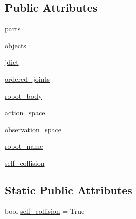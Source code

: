 \subsection*{Public Attributes}
\begin{DoxyCompactItemize}
\item 
\hyperlink{classpybullet-gym_1_1pybulletgym_1_1envs_1_1roboschool_1_1robots_1_1robot__bases_1_1_xml_based_robot_a2491b7eec86e9cd426047c4077561c48}{parts}
\item 
\hyperlink{classpybullet-gym_1_1pybulletgym_1_1envs_1_1roboschool_1_1robots_1_1robot__bases_1_1_xml_based_robot_a428a2aea133de4c5a2a55b2a2444ca21}{objects}
\item 
\hyperlink{classpybullet-gym_1_1pybulletgym_1_1envs_1_1roboschool_1_1robots_1_1robot__bases_1_1_xml_based_robot_a1f70bcc9f587d513c939a408a29d9f0e}{jdict}
\item 
\hyperlink{classpybullet-gym_1_1pybulletgym_1_1envs_1_1roboschool_1_1robots_1_1robot__bases_1_1_xml_based_robot_a1d3338143057849f1f760ce94a5976c0}{ordered\+\_\+joints}
\item 
\hyperlink{classpybullet-gym_1_1pybulletgym_1_1envs_1_1roboschool_1_1robots_1_1robot__bases_1_1_xml_based_robot_a99b7a7b654950adffa9dc38daa523b58}{robot\+\_\+body}
\item 
\hyperlink{classpybullet-gym_1_1pybulletgym_1_1envs_1_1roboschool_1_1robots_1_1robot__bases_1_1_xml_based_robot_a750c9a8aec0030cc9ed278fbcea18d37}{action\+\_\+space}
\item 
\hyperlink{classpybullet-gym_1_1pybulletgym_1_1envs_1_1roboschool_1_1robots_1_1robot__bases_1_1_xml_based_robot_a3179d41c6af31fdc7bedb3a4a1081a2a}{observation\+\_\+space}
\item 
\hyperlink{classpybullet-gym_1_1pybulletgym_1_1envs_1_1roboschool_1_1robots_1_1robot__bases_1_1_xml_based_robot_a27a9dfbfbfd4f3478cc4ea4ace80af97}{robot\+\_\+name}
\item 
\hyperlink{classpybullet-gym_1_1pybulletgym_1_1envs_1_1roboschool_1_1robots_1_1robot__bases_1_1_xml_based_robot_ac7498096e02a63a2532196028e673bff}{self\+\_\+collision}
\end{DoxyCompactItemize}
\subsection*{Static Public Attributes}
\begin{DoxyCompactItemize}
\item 
bool \hyperlink{classpybullet-gym_1_1pybulletgym_1_1envs_1_1roboschool_1_1robots_1_1robot__bases_1_1_xml_based_robot_ab6ba95cc9efcb674bb70711d09755b02}{self\+\_\+collision} = True
\end{DoxyCompactItemize}


